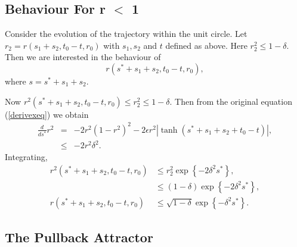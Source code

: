 \subsection{Behaviour For r $<$ 1}\label{secrsm1}

Consider the evolution of the trajectory within the unit
circle. Let $r_{2} = r(s_1+s_{2}, t_0-t,r_{0})$ with $s_1, s_2$ and $t$
defined as above. Here $r_2^2 \leq 1-\delta$. Then we are
interested in the behaviour of
\begin{equation*}
  r(s^*+s_{1}+s_{2},t_0-t,r_{0}),
\end{equation*}
where $s = s^* + s_1 +s_2$.

Now $ r^2(s^*+s_{1}+s_{2},t_0-t,r_{0}) \leq r_2^2 \leq 1 - \delta$.
Then from the original equation (\ref{derivexeq}) we obtain
\begin{eqnarray*}
  \frac{d}{ds^*} r^2  & = & - 2r^2(1-r^2)^2 - 2 \epsilon r^2
                        |\tanh(s^*+s_1+s_2+t_0-t)|, \\
  & \leq & - 2r^{2}\delta^{2}.
\end{eqnarray*}
Integrating,
\begin{align*}
  r^2(s^*+s_1+s_2,t_0-t,r_0) & \leq r^2_2\exp\left\{-2\delta^{2}s^*
                \right\}, \nonumber \\
  & \leq (1-\delta)\exp\left\{-2\delta^{2}s^* \right\}, \\
  r(s^*+s_1+s_2,t_0-t,r_0) & \leq \sqrt{1-\delta}\exp\left\{-
        \delta^{2}s^* \right\}.
\end{align*}

\subsection{The Pullback Attractor}


